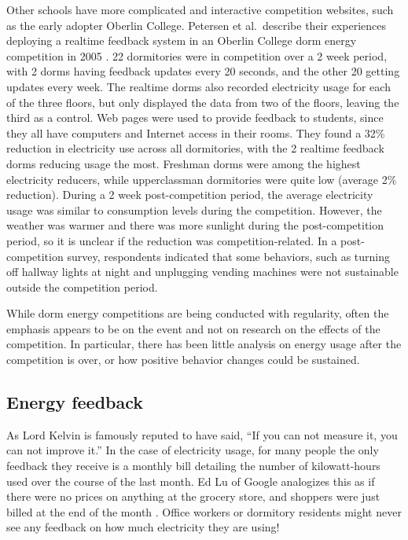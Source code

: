 Other schools have more complicated and interactive competition websites, such as the early adopter Oberlin College. Petersen et al.\ describe their experiences deploying a realtime feedback system in an Oberlin College dorm energy competition in 2005 \cite{petersen-dorm-energy-reduction}. 22 dormitories were in competition over a 2 week period, with 2 dorms having feedback updates every 20 seconds, and the other 20 getting updates every week. The realtime dorms also recorded electricity usage for each of the three floors, but only displayed the data from two of the floors, leaving the third as a control. Web pages were used to provide feedback to students, since they all have computers and Internet access in their rooms. They found a 32\% reduction in electricity use across all dormitories, with the 2 realtime feedback dorms reducing usage the most. Freshman dorms were among the highest electricity reducers, while upperclassman dormitories were quite low (average 2\% reduction). During a 2 week post-competition period, the average electricity usage was similar to consumption levels during the competition. However, the weather was warmer and there was more sunlight during the post-competition period, so it is unclear if the reduction was competition-related. In a post-competition survey, respondents indicated that some behaviors, such as turning off hallway lights at night and unplugging vending machines were not sustainable outside the competition period.

While dorm energy competitions are being conducted with regularity, often the emphasis appears to be on the event and not on research on the effects of the competition. In particular, there has been little analysis on energy usage after the competition is over, or how positive behavior changes could be sustained.

\subsection{Energy feedback}

As Lord Kelvin is famously reputed to have said, ``If you can not measure it, you can not improve it.'' In the case of electricity usage, for many people the only feedback they receive is a monthly bill detailing the number of kilowatt-hours used over the course of the last month. Ed Lu of Google analogizes this as if there were no prices on anything at the grocery store, and shoppers were just billed at the end of the month \cite{Helft2008Googles-Energy}. Office workers or dormitory residents might never see any feedback on how much electricity they are using!

